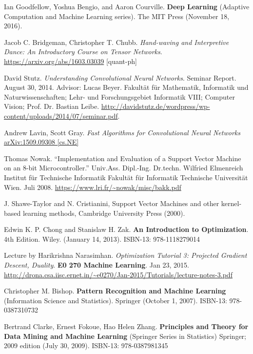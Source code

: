 \documentclass[10pt]{amsart}
\begin{document}
\begin{thebibliography}{9}
Ian Goodfellow, Yoshua Bengio, and Aaron Courville.  \textbf{Deep Learning} (Adaptive Computation and Machine Learning series).  The MIT Press (November 18, 2016).  


Jacob C. Bridgeman, Christopher T. Chubb.  \emph{Hand-waving and Interpretive Dance: An Introductory Course on Tensor Networks}.  
\href{arXiv:1603.03039}{https://arxiv.org/abs/1603.03039} [quant-ph]


David Stutz.  \emph{Understanding Convolutional Neural Networks}.  Seminar Report.  August 30, 2014.  Advisor: Lucas Beyer.  Fakultät für Mathematik, Informatik und Naturwissenschaften; Lehr- und Forschungsgebiet Informatik VIII; Computer Vision; Prof. Dr. Bastian Leibe.  \url{http://davidstutz.de/wordpress/wp-content/uploads/2014/07/seminar.pdf}.  

Andrew Lavin, Scott Gray.  \emph{Fast Algorithms for Convolutional Neural Networks} \href{https://arxiv.org/abs/1509.09308}{arXiv:1509.09308 [cs.NE]}

Thomas Nowak.  ``Implementation and Evaluation of a Support Vector Machine on an 8-bit Microcontroller.''  Univ.Ass. Dipl.-Ing. Dr.techn. Wilfried Elmenreich Institut f\"{u}r Technische Informatik Fakult\"{a}t f\"{u}r Informatik Technische Universit\"{a}t Wien.  Juli 2008.  \url{https://www.lri.fr/~nowak/misc/bakk.pdf}

J.  Shawe-Taylor  and  N.  Cristianini,  Support  Vector  Machines  and  other  kernel-based  learning  methods,
Cambridge University Press (2000).

Edwin K. P. Chong and Stanislaw H. Zak.  \textbf{An Introduction to Optimization}.  4th Edition.  Wiley.  (January 14, 2013).  ISBN-13: 978-1118279014
  
Lecture by Harikrishna Narasimhan.  \emph{Optimization Tutorial 3: Projected Gradient Descent, Duality}.  \textbf{E0 270 Machine Learning}.  Jan 23, 2015.  \url{http://drona.csa.iisc.ernet.in/~e0270/Jan-2015/Tutorials/lecture-notes-3.pdf}

Christopher M. Bishop.  \textbf{Pattern Recognition and Machine Learning} (Information Science and Statistics).  Springer (October 1, 2007).  ISBN-13: 978-0387310732


Bertrand Clarke, Ernest Fokoue, Hao Helen Zhang.   \textbf{Principles and Theory for Data Mining and Machine Learning} (Springer Series in Statistics)  Springer; 2009 edition (July 30, 2009).  ISBN-13: 978-0387981345
 


\end{thebibliography}
\end{document}
